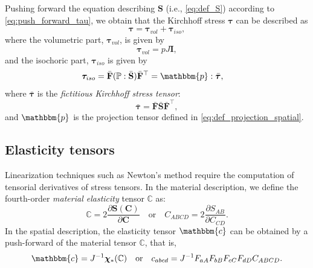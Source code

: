 \documentclass{sfuthesis}
\numberwithin{equation}{section}
\numberwithin{figure}{chapter}
\numberwithin{table}{chapter}
\theoremstyle{definition}
\def\*#1{{\mathbf{#1}}} %
\newcommand{\pder}[2]{\dfrac{\partial #1}{\partial #2}}
\newcommand{\C}{\mathbb{C}}
\newcommand{\T}{\top}
\renewcommand{\c}{\mathbbm{c}}
\renewcommand{\P}{\mathbb{P}}
\newcommand{\p}{\mathbbm{p}}
\def\btau{{\bm{\tau}}}
\def\bchi{{\bm{\chi}}}
\begin{document}
Pushing forward the equation describing $\*S$ (i.e., \eqref{eq:def_S}) according to \eqref{eq:push_forward_tau}, we obtain that the Kirchhoff stress $\btau$ can be described as
\begin{equation} \label{eq:def_tau}
\btau = \btau_{vol} + \btau_{iso},
\end{equation}
where the volumetric part, $\btau_{vol}$, is given by
\begin{equation}
\btau_{vol} = pJ \*I,
\end{equation}
and the isochoric part, $\btau_{iso}$ is given by
\begin{equation} \label{eq:def_tau_iso}
\btau_{iso} = \bar{\*F} (\P : \bar{\*S}) \bar{\*F}^\T = \p : \bar{\btau}, \quad
\end{equation}
where $\bar{\btau}$ is the \textit{fictitious Kirchhoff stress tensor}:
\begin{equation} \label{eq:def_tau_bar}
    \bar{\btau} = \bar{\*F} \bar{\*S} \bar{\*F}^\T,
\end{equation} 
and $\p$ is the projection tensor defined in \eqref{eq:def_projection_spatial}.

\subsection*{Elasticity tensors}

Linearization techniques such as Newton's method require the computation of tensorial derivatives of stress tensors. In the material description, we define the fourth-order \textit{material elasticity} tensor $\C$ as:
\begin{equation}
\C = 2\pder{\*S(\*C)}{\*C} \quad \text{or} \quad C_{ABCD} = 2\pder{S_{AB}}{C_{CD}}.
\end{equation}
In the spatial description, the elasticity tensor $\c$ can be obtained by a push-forward of the material tensor $\C$, that is,
\begin{equation} \label{eq:def_c_spatial}
\c = J^{-1} \bchi_*(\C) \quad \text{or} \quad c_{abcd} = J^{-1} F_{aA} F_{bB} F_{cC} F_{dD} C_{ABCD}.
\end{equation}
\end{document}
